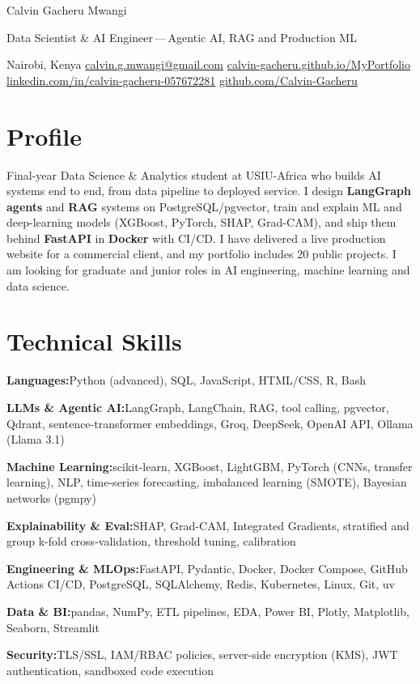 \documentclass[10pt,a4paper]{article}
\newcommand{\sep}{\hspace{0.45em}{\color{rule}|}\hspace{0.45em}}
\newcommand{\skill}[2]{{\textbf{#1:}\hspace{0.4em}#2\par}\vspace{2pt}}
\begin{document}
{\fontsize{24}{28}\selectfont{}\selectfont Calvin Gacheru Mwangi}\par
\vspace{3pt}
{\fontsize{12}{14}\selectfont\color{accent} Data Scientist \& AI Engineer\,—\,Agentic AI, RAG and Production ML}\par
\vspace{5pt}
{\small\color{muted}
Nairobi, Kenya\sep
\href{mailto:calvin.g.mwangi@gmail.com}{calvin.g.mwangi@gmail.com}\sep
\href{https://calvin-gacheru.github.io/MyPortfolio/}{calvin-gacheru.github.io/MyPortfolio}\\[1pt]
\href{https://ke.linkedin.com/in/calvin-gacheru-057672281}{linkedin.com/in/calvin-gacheru-057672281}\sep
\href{https://github.com/Calvin-Gacheru}{github.com/Calvin-Gacheru}
}\par

\section{Profile}
Final-year Data Science \& Analytics student at USIU-Africa who builds AI systems end to end, from data pipeline to deployed service.
I design \textbf{LangGraph agents} and \textbf{RAG} systems on PostgreSQL/pgvector, train and explain ML and deep-learning models
(XGBoost, PyTorch, SHAP, Grad-CAM), and ship them behind \textbf{FastAPI} in \textbf{Docker} with CI/CD.
I have delivered a live production website for a commercial client, and my portfolio includes 20 public projects.
I am looking for graduate and junior roles in AI engineering, machine learning and data science.

\section{Technical Skills}
\skill{Languages}{Python (advanced), SQL, JavaScript, HTML/CSS, R, Bash}
\skill{LLMs \& Agentic AI}{LangGraph, LangChain, RAG, tool calling, pgvector, Qdrant, sentence-transformer embeddings, Groq, DeepSeek, OpenAI API, Ollama (Llama 3.1)}
\skill{Machine Learning}{scikit-learn, XGBoost, LightGBM, PyTorch (CNNs, transfer learning), NLP, time-series forecasting, imbalanced learning (SMOTE), Bayesian networks (pgmpy)}
\skill{Explainability \& Eval}{SHAP, Grad-CAM, Integrated Gradients, stratified and group k-fold cross-validation, threshold tuning, calibration}
\skill{Engineering \& MLOps}{FastAPI, Pydantic, Docker, Docker Compose, GitHub Actions CI/CD, PostgreSQL, SQLAlchemy, Redis, Kubernetes, Linux, Git, uv}
\skill{Data \& BI}{pandas, NumPy, ETL pipelines, EDA, Power BI, Plotly, Matplotlib, Seaborn, Streamlit}
\skill{Security}{TLS/SSL, IAM/RBAC policies, server-side encryption (KMS), JWT authentication, sandboxed code execution}
\end{document}
